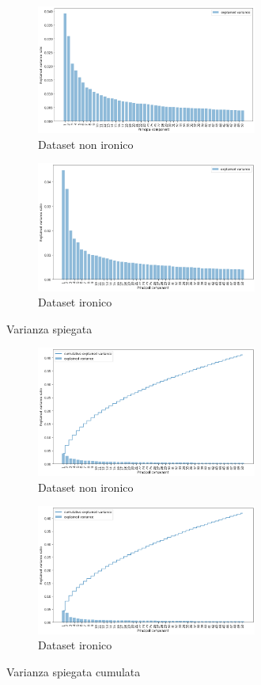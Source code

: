 \documentclass[oneside]{book}
\begin{document}
\begin{figure}[H]
	\begin{subfigure}[H]{0.5 \textwidth}
		\centering
		\includegraphics[width=7.25cm]{assets/pca/non_ironic/var.png}
		\caption{Dataset non ironico}
	\end{subfigure}
	\hfill
	\begin{subfigure}[H]{0.5 \textwidth}
		\centering
		\includegraphics[width=7.25cm]{assets/pca/ironic/var.png}
		\caption{Dataset ironico}
	\end{subfigure}
	\caption{Varianza spiegata}
\end{figure}

\begin{figure}[H]
	\begin{subfigure}[H]{0.5 \textwidth}
		\centering
		\includegraphics[width=7.25cm]{assets/pca/non_ironic/cum-var.png}
		\caption{Dataset non ironico}
	\end{subfigure}
	\hfill
	\begin{subfigure}[H]{0.5 \textwidth}
		\centering
		\includegraphics[width=7.25cm]{assets/pca/ironic/cum-var.png}
		\caption{Dataset ironico}
	\end{subfigure}
	\caption{Varianza spiegata cumulata}
\end{figure}
\end{document}
